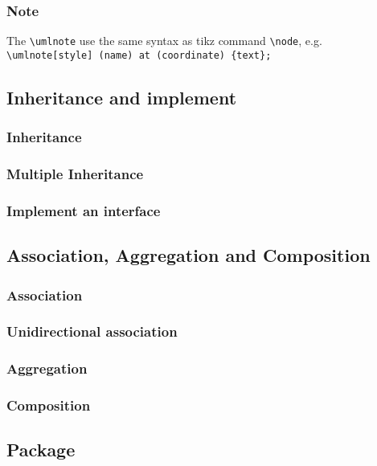 \documentclass{article}
\newcommand{\demo}[2][1]{
\begin{minipage}{.49\linewidth}
\centering
\resizebox{#1\linewidth}{!}{

}
\end{minipage}
\hspace{0.01\linewidth}
\begin{minipage}{.5\linewidth}

\end{minipage}
}
\begin{document}
\subsubsection{Note}
The \lstinline|\umlnote| use the same syntax as tikz command
\lstinline|\node|, e.g. \lstinline|\umlnote[style] (name) at (coordinate) {text};|

\demo[0.7]{note}

\subsection{Inheritance and implement}
\subsubsection{Inheritance}
\demo{inheritance}
\subsubsection{Multiple Inheritance}
\demo{multiple-inheritance}

\subsubsection{Implement an interface}
\demo{implement-interface}

\subsection{Association, Aggregation and Composition}
\subsubsection{Association}
\demo{association}

\subsubsection{Unidirectional association}
\demo{unidirectional-association}

\subsubsection{Aggregation}
\demo{aggregation}

\subsubsection{Composition}
\demo{composition}

\subsection{Package}
\demo{package}
\end{document}
